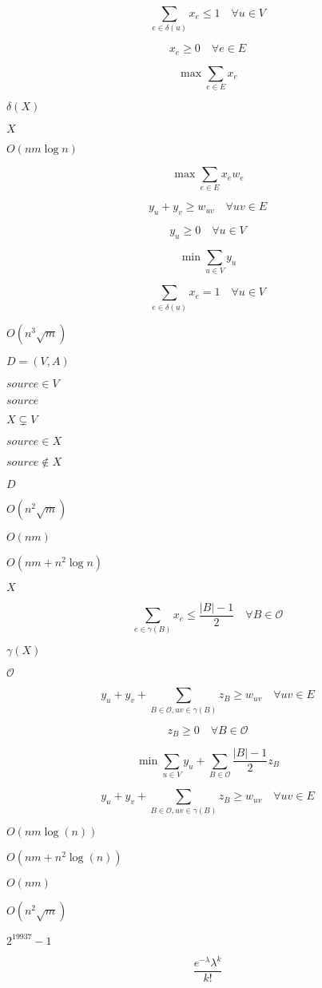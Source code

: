 \documentclass{article}
\begin{document}
\[ \sum_{e \in \delta(u)}x_e \le 1 \quad \forall u\in V\]
\pagebreak

\[x_e \ge 0\quad \forall e\in E\]
\pagebreak

\[\max \sum_{e\in E}x_e\]
\pagebreak

$\delta(X)$
\pagebreak

$X$
\pagebreak

$O(nm\log n)$
\pagebreak

\[\max \sum_{e\in E}x_ew_e\]
\pagebreak

\[ y_u + y_v \ge w_{uv} \quad \forall uv\in E\]
\pagebreak

\[y_u \ge 0 \quad \forall u \in V\]
\pagebreak

\[\min \sum_{u \in V}y_u \]
\pagebreak

\[ \sum_{e \in \delta(u)}x_e = 1 \quad \forall u\in V\]
\pagebreak

$O(n^3\sqrt{m})$
\pagebreak

$D=(V,A)$
\pagebreak

$ source \in V $
\pagebreak

$ source $
\pagebreak

$ X\subsetneq V $
\pagebreak

$ source \in X $
\pagebreak

$ source \notin X $
\pagebreak

$ D $
\pagebreak

$ O(n^2\sqrt{m}) $
\pagebreak

$O(nm)$
\pagebreak

$ O(nm + n^2 \log n) $
\pagebreak

$ X $
\pagebreak

\[ \sum_{e \in \gamma(B)}x_e \le \frac{\vert B \vert - 1}{2}
\quad \forall B\in\mathcal{O}\]
\pagebreak

$\gamma(X)$
\pagebreak

$\mathcal{O}$
\pagebreak

\[ y_u + y_v + \sum_{B \in \mathcal{O}, uv \in \gamma(B)}
z_B \ge w_{uv} \quad \forall uv\in E\]
\pagebreak

\[z_B \ge 0 \quad \forall B \in \mathcal{O}\]
\pagebreak

\[\min \sum_{u \in V}y_u + \sum_{B \in \mathcal{O}}
\frac{\vert B \vert - 1}{2}z_B\]
\pagebreak

\[ y_u + y_v + \sum_{B \in \mathcal{O}, uv \in \gamma(B)}z_B \ge
w_{uv} \quad \forall uv\in E\]
\pagebreak

$ O(nm\log(n)) $
\pagebreak

$ O(nm+n^2\log(n)) $
\pagebreak

$ O(nm) $
\pagebreak

$O(n^2\sqrt{m})$
\pagebreak

$ 2^{19937} - 1 $
\pagebreak

\[ \frac{e^{-\lambda}\lambda^k}{k!} \]
\pagebreak
\end{document}
